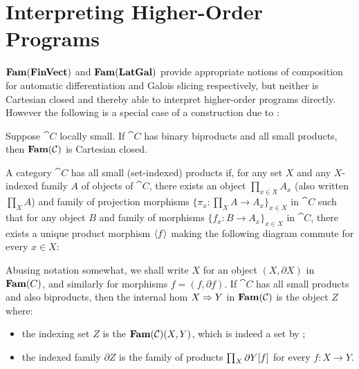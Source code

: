\section{Interpreting Higher-Order Programs}
\label{sec:higher-order}

$\mathbf{Fam}(\mathbf{FinVect})$ and $\mathbf{Fam}(\mathbf{LatGal})$ provide appropriate notions of composition for automatic differentiation
and Galois slicing respectively, but neither is Cartesian closed and thereby able to interpret higher-order
programs directly. However the following is a special case of a construction due to \citet{nunes2023}:

\begin{proposition}
Suppose $\cat{C}$ locally small. If $\cat{C}$ has binary biproducts and all small products, then
$\mathbf{Fam}(\mathcal{C})$ is Cartesian closed.
\end{proposition}

A category $\cat{C}$ has all small (set-indexed) products if, for any set $X$ and any $X$-indexed family $A$
of objects of $\cat{C}$, there exists an object $\prod_{x \in X}A_x$ (also written $\prod_{X} A$) and family
of projection morphisms $\{\pi_x: \prod_{X} A \to A_x\}_{x \in X}$ in $\cat{C}$ such that for any object $B$
and family of morphisms $\{f_x: B \to A_x\}_{x \in X}$ in $\cat{C}$, there exists a unique product morphism
$\langle f\rangle$ making the following diagram commute for every $x \in X$:

\begin{center}
\end{center}

Abusing notation somewhat, we shall write $X$ for an object $(X, \partial X)$ in $\mathbf{Fam}(C)$, and similarly for
morphisms $f = (f, \partial f)$. If $\cat{C}$ has all small products and also biproducts, then the internal
hom $X \Rightarrow Y$ in $\mathbf{Fam}(\mathcal{C})$ is the object $Z$ where:
\begin{itemize}
\item the indexing set $Z$ is the $\mathbf{Fam}(\mathcal{C})(X, Y)$, which is indeed a set by
;
\item the indexed family $\partial Z$ is the family of products $\prod_{X}\partial Y[f]$ for every
${f: X \to Y}$.
\end{itemize}

